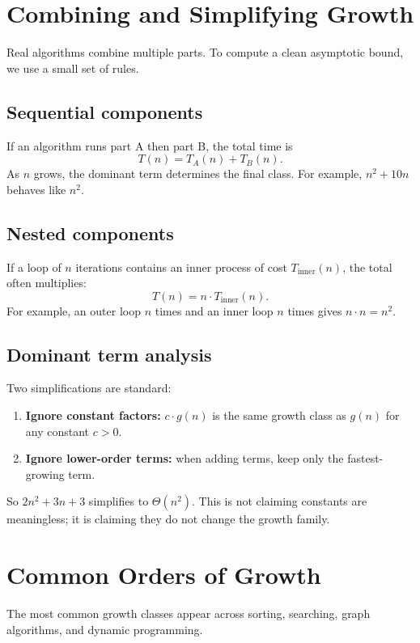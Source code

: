 \documentclass[12pt]{scrartcl}
\begin{document}
\section{Combining and Simplifying Growth}
Real algorithms combine multiple parts. To compute a clean asymptotic bound, we use a small set of rules.

\subsection{Sequential components}
If an algorithm runs part A then part B, the total time is
\[
	T(n)=T_A(n)+T_B(n).
\]
As \(n\) grows, the dominant term determines the final class. For example, \(n^2 + 10n\) behaves like \(n^2\).

\subsection{Nested components}
If a loop of \(n\) iterations contains an inner process of cost \(T_{\text{inner}}(n)\), the total often multiplies:
\[
	T(n)=n\cdot T_{\text{inner}}(n).
\]
For example, an outer loop \(n\) times and an inner loop \(n\) times gives \(n\cdot n = n^2\).

\subsection{Dominant term analysis}
Two simplifications are standard:
\begin{enumerate}[leftmargin=1.5em]
	\item \textbf{Ignore constant factors:} \(c\cdot g(n)\) is the same growth class as \(g(n)\) for any constant \(c>0\).
	\item \textbf{Ignore lower-order terms:} when adding terms, keep only the fastest-growing term.
\end{enumerate}

So \(2n^2 + 3n + 3\) simplifies to \(\Theta(n^2)\). This is not claiming constants are meaningless; it is claiming they do not change the growth family.

\section{Common Orders of Growth}
The most common growth classes appear across sorting, searching, graph algorithms, and dynamic programming.
\end{document}
